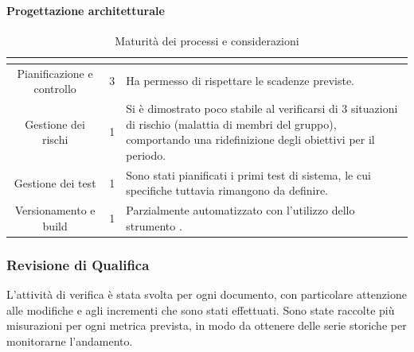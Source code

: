 \paragraph{Progettazione architetturale}\MiniSpazio
\renewcommand{\arraystretch}{1.5}
\begin{table}[H]
	\begin{center}
		\begin{tabular}{|c|c|p{6.8cm}|}
			\hline
			\rowcolor{title_row}
			\textbf{\color{title_text}{Processo}} & \textbf{\color{title_text}{Livello di maturità}} & \textbf{\color{title_text}{Considerazioni}} \\
			\hline
			{Pianificazione e controllo} & {3} & {Ha permesso di rispettare le scadenze previste.}\\	
			\hline
			{Gestione dei rischi} & {1} & {Si è dimostrato poco stabile al verificarsi di 3 situazioni di rischio (malattia di membri del gruppo), comportando una ridefinizione degli obiettivi per il periodo.}\\	
			\hline
			{Gestione dei test} & {1} & {Sono stati pianificati i primi test di sistema, le cui specifiche tuttavia rimangono da definire.}\\	
			\hline
			{Versionamento e build} & {1} & {Parzialmente automatizzato con l'utilizzo dello strumento \gl{Travis}.}\\	
			\hline
		\end{tabular}
		\caption[Maturità dei processi, Progettazione Architetturale]{Maturità dei processi e considerazioni}	
		\label{tabella: considerazioni sulla maturità dei processi raggiunta pa}
	\end{center}
\end{table}
\renewcommand{\arraystretch}{1}

\subsubsection{Revisione di Qualifica}
L'attività di verifica è stata svolta per ogni documento, con particolare attenzione alle modifiche e agli incrementi che sono stati effettuati. Sono state raccolte più misurazioni per ogni metrica prevista, in modo da ottenere delle serie storiche per monitorarne l'andamento.
